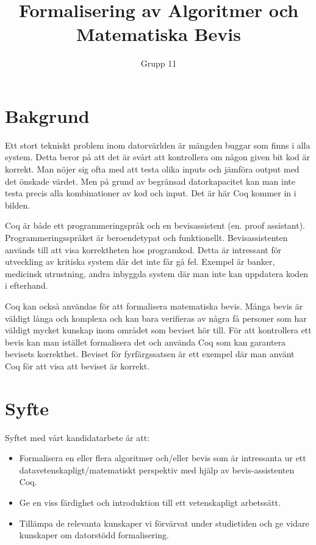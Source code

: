 \documentclass[a4paper]{article}
\author{Grupp 11}
\title{Formalisering av Algoritmer och Matematiska Bevis}
\begin{document}
\maketitle
\thispagestyle{empty}
\newpage

\section*{Bakgrund}

Ett stort tekniskt problem inom datorvärlden är mängden buggar som finns i alla
system. Detta beror på att det är svårt att kontrollera om någon given bit kod
är korrekt. Man nöjer sig ofta med att testa olika inputs och jämföra output
med det önskade värdet. Men på grund av begränsad datorkapacitet kan man inte
testa precis alla kombinationer av kod och input. Det är här Coq kommer in i
bilden.

Coq är både ett programmeringspråk och en bevisassistent (en. proof assistant).
Programmeringsspråket är beroendetypat och funktionellt. Bevisassistenten
används till att visa korrektheten hos programkod. Detta är intressant för
utveckling av kritiska system där det inte får gå fel. Exempel är banker,
medicinsk utrustning, andra inbyggda system där man inte kan uppdatera koden i
efterhand.

Coq kan också användas för att formalisera matematiska bevis. Många bevis är
väldigt långa och komplexa och kan bara verifieras av några få personer som har
väldigt mycket kunskap inom området som beviset hör till. För att kontrollera
ett bevis kan man istället formalisera det och använda Coq som kan garantera
bevisets korrekthet. Beviset för fyrfärgssatsen är ett exempel där man använt
Coq för att visa att beviset är korrekt.

\section*{Syfte}

Syftet med vårt kandidatarbete är att:

\begin{itemize}
  \item Formalisera en eller flera algoritmer och/eller bevis som är
    intressanta ur ett datavetenskapligt/matematiskt perspektiv med hjälp av
    bevis-assistenten Coq.
  \item Ge en viss färdighet och introduktion till ett vetenskapligt
    arbetssätt.
  \item Tillämpa de relevanta kunskaper vi förvärvat under studietiden och ge
    vidare kunskaper om datorstödd formalisering.
\end{itemize}
\end{document}
